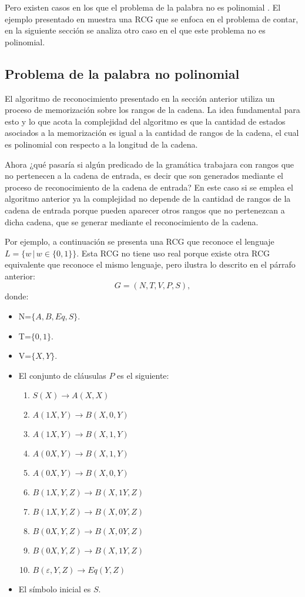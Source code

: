 \documentclass[12pt]{article}
\begin{document}
Pero existen casos en los que el problema de la palabra no es polinomial \cite{propertiesRCGBib}.
El ejemplo presentado en \cite{propertiesRCGBib} muestra una RCG que se enfoca en el problema de contar,
en la siguiente sección se analiza otro caso en el que este problema no es polinomial.

\subsection{Problema de la palabra no polinomial}

El algoritmo de reconocimiento presentado en la sección anterior utiliza un proceso de memorización sobre los rangos de la cadena.
La idea fundamental para esto y lo que acota la complejidad del algoritmo es que la cantidad de estados
asociados a la memorización es igual a la cantidad de rangos de la cadena, el cual es polinomial con respecto
a la longitud de la cadena.

Ahora ¿qué pasaría si algún predicado de la gramática trabajara con rangos que no pertenecen a la cadena de entrada, es decir que son generados mediante
el proceso de reconocimiento de la cadena de entrada? En este caso si se emplea el algoritmo anterior ya la complejidad no depende de la cantidad de rangos de la cadena de entrada
porque pueden aparecer otros rangos que no pertenezcan a dicha cadena, que se generar mediante el reconocimiento de la cadena.

Por ejemplo, a continuación se presenta una RCG que reconoce el lenguaje $L=\{w\,|\,w\in\{0,1\}\}$. Esta RCG no tiene uso real porque existe otra RCG equivalente que reconoce el
mismo lenguaje, pero ilustra lo descrito en el párrafo anterior:
\[
    G = (N, T, V, P, S),
\]
donde:

\begin{itemize}
    \item  N=$\{A,B,Eq,S\}$.
    \item T=$\{0,1\}$.
    \item V=$\{X,Y\}$.
    \item El conjunto de cláusulas $P$ es el siguiente:
          \begin{enumerate}
              \item $S(X)\to A(X,X)$
              \item $A(1X,Y)\to B(X,0,Y)$
              \item $A(1X,Y)\to B(X,1,Y)$
              \item $A(0X,Y)\to B(X,1,Y)$
              \item $A(0X,Y)\to B(X,0,Y)$
              \item $B(1X,Y,Z)\to B(X,1Y,Z)$
              \item $B(1X,Y,Z)\to B(X,0Y,Z)$
              \item $B(0X,Y,Z)\to B(X,0Y,Z)$
              \item $B(0X,Y,Z)\to B(X,1Y,Z)$
              \item $B(\varepsilon,Y,Z)\to Eq(Y,Z)$
          \end{enumerate}

    \item El símbolo inicial es $S$.
\end{itemize}
\end{document}
